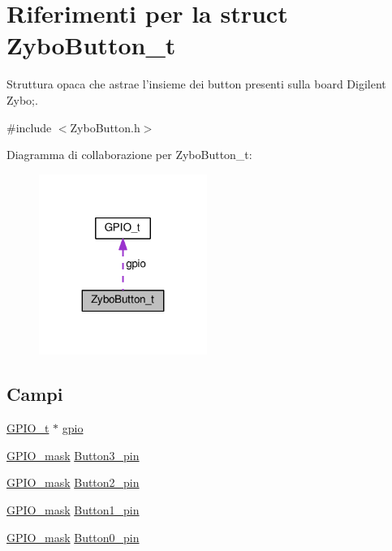 \hypertarget{struct_zybo_button__t}{\section{Riferimenti per la struct Zybo\+Button\+\_\+t}
\label{struct_zybo_button__t}
}


Struttura opaca che astrae l'insieme dei button presenti sulla board Digilent Zybo;.  




{\ttfamily \#include $<$Zybo\+Button.\+h$>$}



Diagramma di collaborazione per Zybo\+Button\+\_\+t\+:\nopagebreak
\begin{figure}[H]
\begin{center}
\leavevmode
\includegraphics[width=155pt]{struct_zybo_button__t__coll__graph}
\end{center}
\end{figure}
\subsection*{Campi}
\begin{DoxyCompactItemize}
\item 
\hyperlink{struct_g_p_i_o__t}{G\+P\+I\+O\+\_\+t} $\ast$ \hyperlink{struct_zybo_button__t_acb3116190992a4d8d26545c103304d27}{gpio}
\item 
\hyperlink{group___g_p_i_o_ga6d5aef8a8a54ee2f602d47252ff66595}{G\+P\+I\+O\+\_\+mask} \hyperlink{struct_zybo_button__t_a0be2104e3b0077272dcbfee7dbdb14ee}{Button3\+\_\+pin}
\item 
\hyperlink{group___g_p_i_o_ga6d5aef8a8a54ee2f602d47252ff66595}{G\+P\+I\+O\+\_\+mask} \hyperlink{struct_zybo_button__t_a249726210aba837b00df4d2afc89965d}{Button2\+\_\+pin}
\item 
\hyperlink{group___g_p_i_o_ga6d5aef8a8a54ee2f602d47252ff66595}{G\+P\+I\+O\+\_\+mask} \hyperlink{struct_zybo_button__t_aa4b6f01d89a502266798176affa8f59b}{Button1\+\_\+pin}
\item 
\hyperlink{group___g_p_i_o_ga6d5aef8a8a54ee2f602d47252ff66595}{G\+P\+I\+O\+\_\+mask} \hyperlink{struct_zybo_button__t_aa079dc844a7d73e98b762cef39e9bf90}{Button0\+\_\+pin}
\end{DoxyCompactItemize}


